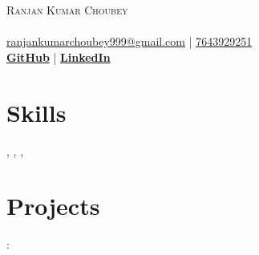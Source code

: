 \documentclass[a4paper]{article}
\begin{document}
\begin{center}
    {\Huge \scshape Ranjan Kumar Choubey}\\
    {\large \textbf{\JobTitle}} \\
    \href{mailto:ranjankumarchoubey999@gmail.com}{ranjankumarchoubey999@gmail.com} | 
    \href{tel:7643929251}{7643929251} \\
    \textbf{\href{https://github.com/YOUR_GITHUB_USERNAME}{GitHub}} |
    \textbf{\href{https://linkedin.com/in/YOUR_LINKEDIN}{LinkedIn}}
\end{center}

\section*{Skills}
\textbf{\SkillOne}, \textbf{\SkillTwo}, \textbf{\SkillThree}, \textbf{\SkillFour}

\section*{Projects}
\textbf{\ProjectOneTitle}: \ProjectOneDesc
\end{document}
